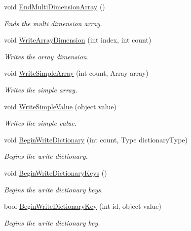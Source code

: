 \begin{DoxyCompactItemize}
void \hyperlink{interface_serialization_1_1_i_storage_aace2c7b698493c52356bff6422d37f74}{End\+Multi\+Dimension\+Array} ()
\begin{DoxyCompactList}\small\item\em Ends the multi dimension array. \end{DoxyCompactList}\item 
void \hyperlink{interface_serialization_1_1_i_storage_a844c1dfe7f787cbf76d0521ca4ea11ef}{Write\+Array\+Dimension} (int index, int count)
\begin{DoxyCompactList}\small\item\em Writes the array dimension. \end{DoxyCompactList}\item 
void \hyperlink{interface_serialization_1_1_i_storage_a94937afa442d505b3802f9dd19675ee2}{Write\+Simple\+Array} (int count, Array array)
\begin{DoxyCompactList}\small\item\em Writes the simple array. \end{DoxyCompactList}\item 
void \hyperlink{interface_serialization_1_1_i_storage_ad71e5330badb887d80a59b576dbd9e1e}{Write\+Simple\+Value} (object value)
\begin{DoxyCompactList}\small\item\em Writes the simple value. \end{DoxyCompactList}\item 
void \hyperlink{interface_serialization_1_1_i_storage_ac8185d715cc5318790a408427e5bc113}{Begin\+Write\+Dictionary} (int count, Type dictionary\+Type)
\begin{DoxyCompactList}\small\item\em Begins the write dictionary. \end{DoxyCompactList}\item 
void \hyperlink{interface_serialization_1_1_i_storage_a06dcc7ec3a100509abc863136d0cd6f3}{Begin\+Write\+Dictionary\+Keys} ()
\begin{DoxyCompactList}\small\item\em Begins the write dictionary keys. \end{DoxyCompactList}\item 
bool \hyperlink{interface_serialization_1_1_i_storage_a73c60fce612a22b4832223b245688384}{Begin\+Write\+Dictionary\+Key} (int id, object value)
\begin{DoxyCompactList}\small\item\em Begins the write dictionary key. \end{DoxyCompactList}\item 

\end{DoxyCompactItemize}
